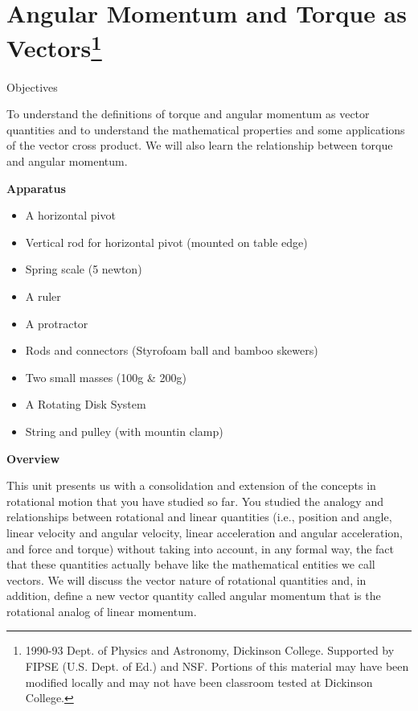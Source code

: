 \def\bmath#1{\mbox{\boldmath$#1$}} 


\section{Angular Momentum and Torque as Vectors\footnote{
1990-93 Dept. of Physics and Astronomy, Dickinson College. Supported by FIPSE
(U.S. Dept. of Ed.) and NSF. Portions of this material may have been modified
locally and may not have been classroom tested at Dickinson College.
}}

\makelabheader %

Objectives 

To understand the definitions of torque and angular momentum as vector quantities
and to understand the mathematical properties and some applications of the vector
cross product. We will also learn the relationship between torque and angular
momentum.

\textbf{Apparatus}

\begin{itemize}
\item A horizontal pivot
\item Vertical rod for horizontal pivot (mounted on table edge)
\item Spring scale (5 newton)
\item A ruler 
\item A protractor 
\item Rods and connectors (Styrofoam ball and bamboo skewers)
\item Two small masses (100g \& 200g) 
\item A Rotating Disk System 
\item String and pulley (with mountin clamp)
\end{itemize}
\textbf{Overview} 

This unit presents us with a consolidation and extension of the concepts in
rotational motion that you have studied so far. You studied the analogy and
relationships between rotational and linear quantities (i.e., position and angle,
linear velocity and angular velocity, linear acceleration and angular acceleration,
and force and torque) without taking into account, in any formal way, the fact
that these quantities actually behave like the mathematical entities we call
vectors. We will discuss the vector nature of rotational quantities and, in
addition, define a new vector quantity called angular momentum that is the rotational
analog of linear momentum. 

